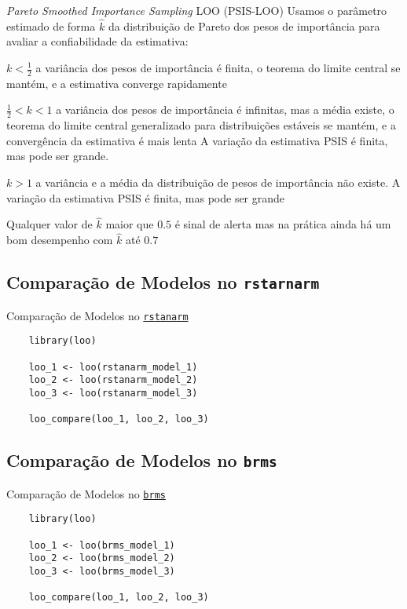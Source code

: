 \begin{frame}{\textit{Pareto Smoothed Importance Sampling} LOO (PSIS-LOO)}
    \small
    Usamos o parâmetro estimado de forma $\widehat{k}$ da distribuição de Pareto
    dos pesos de importância para avaliar a confiabilidade da estimativa:
    \begin{vfilleditems}
        \item \small $k < \frac{1}{2}$ a variância dos pesos de importância é finita,
        o teorema do limite central se mantém, e a estimativa converge rapidamente
        \item \small $\frac{1}{2} < k < 1$ a variância dos pesos de importância é infinitas,
        mas a média existe, o teorema do limite central generalizado
        para distribuições estáveis se mantém, e a convergência da estimativa é mais
        lenta
        A variação da estimativa PSIS é finita, mas pode ser grande.
        \item \small $k > 1$ a variância e a média da distribuição de pesos de importância não
        existe. A variação da estimativa PSIS é finita, mas pode ser grande
    \end{vfilleditems}
    \vfill
    \small
    Qualquer valor de $\widehat{k}$ maior que $0.5$ é sinal de alerta mas na prática
    ainda há um bom desempenho com $\widehat{k}$ até $0.7$
\end{frame}

\subsection{Comparação de Modelos no \texttt{rstarnarm}}
\begin{frame}[fragile]{Comparação de Modelos no \href{http://mc-stan.org/rstanarm/}{\texttt{rstanarm}}}
    \begin{lstlisting}
    library(loo)

    loo_1 <- loo(rstanarm_model_1)
    loo_2 <- loo(rstanarm_model_2)
    loo_3 <- loo(rstanarm_model_3)

    loo_compare(loo_1, loo_2, loo_3)
    \end{lstlisting}
\end{frame}

\subsection{Comparação de Modelos no \texttt{brms}}
\begin{frame}[fragile]{Comparação de Modelos no \href{https://paul-buerkner.github.io/brms/}{\texttt{brms}}}
    \begin{lstlisting}
    library(loo)

    loo_1 <- loo(brms_model_1)
    loo_2 <- loo(brms_model_2)
    loo_3 <- loo(brms_model_3)

    loo_compare(loo_1, loo_2, loo_3)
    \end{lstlisting}
\end{frame}
